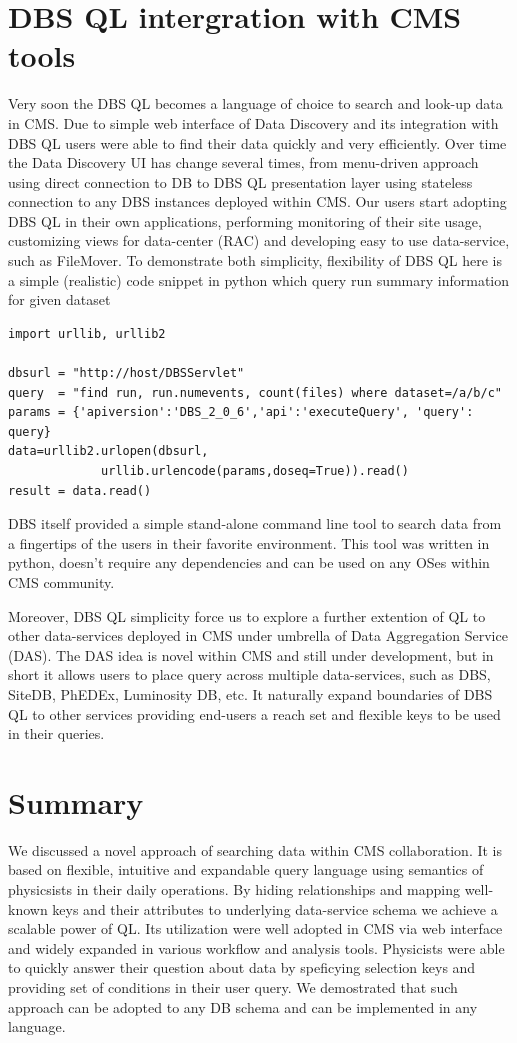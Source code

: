 \documentclass[a4paper]{jpconf}
\begin{document}
\section{DBS QL intergration with CMS tools}
Very soon the DBS QL becomes a language of choice to search
and look-up data in CMS. Due to simple web interface of
Data Discovery\cite{DD}  and its integration with DBS QL
users were able to find their data quickly and very
efficiently. Over time the Data Discovery UI has
change several times, from menu-driven approach using
direct connection to DB to DBS QL presentation layer
using stateless connection to any DBS instances deployed
within CMS. Our users start adopting DBS QL in their
own applications, performing monitoring of their
site usage, customizing views for data-center (RAC)
and developing easy to use data-service, such as
FileMover\cite{FileMover}. To demonstrate both simplicity,
flexibility of DBS QL here is a simple (realistic)
code snippet in python which query run summary information
for given dataset
\begin{verbatim}
import urllib, urllib2

dbsurl = "http://host/DBSServlet"
query  = "find run, run.numevents, count(files) where dataset=/a/b/c"
params = {'apiversion':'DBS_2_0_6','api':'executeQuery', 'query': query} 
data=urllib2.urlopen(dbsurl,
             urllib.urlencode(params,doseq=True)).read()
result = data.read()
\end{verbatim}
DBS itself provided a simple stand-alone command line tool
to search data from a fingertips of the users in their
favorite environment. This tool was written
in python, doesn't require any dependencies and can
be used on any OSes within CMS community.

Moreover, DBS QL simplicity force us to explore a further
extention of QL to other data-services deployed in CMS under
umbrella of Data Aggregation Service (DAS). The DAS idea is
novel within CMS and still under development, but in short
it allows users to place query across multiple data-services,
such as DBS, SiteDB, PhEDEx, Luminosity DB, etc. It naturally
expand boundaries of DBS QL to other services providing
end-users a reach set and flexible keys to be used in their
queries.

\section{Summary}
We discussed a novel approach of searching data within CMS
collaboration. It is based on flexible,
intuitive and expandable query language using
semantics of physicsists in their daily operations.
By hiding relationships and mapping well-known
keys and their attributes to underlying data-service
schema we achieve a scalable power of QL. Its utilization
were well adopted in CMS via web interface and widely
expanded in various workflow and analysis tools. Physicists
were able to quickly answer their question about data by
speficying selection keys and providing set of conditions
in their user query. We demostrated that such approach
can be adopted to any DB schema and can be implemented
in any language.
\end{document}

